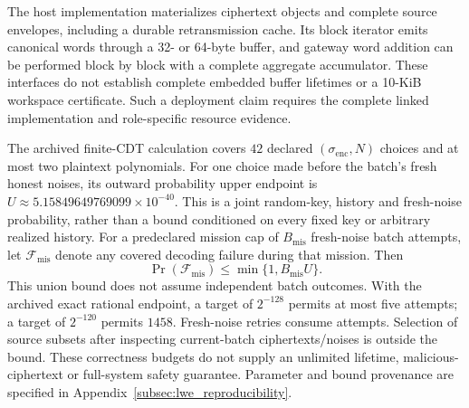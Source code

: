 The host implementation materializes ciphertext objects and complete source
envelopes, including a durable retransmission cache. Its block iterator emits
canonical words through a 32- or 64-byte buffer, and gateway word addition can
be performed block by block with a complete aggregate accumulator. These
interfaces do not establish complete embedded buffer lifetimes or a
10-KiB workspace certificate. Such a deployment claim requires the complete
linked implementation and role-specific resource evidence.

The archived finite-CDT calculation covers $42$ declared $(\sigma_{\mathrm{enc}},N)$
choices and at most two plaintext polynomials. For one choice made before the
batch's fresh honest noises, its outward probability upper endpoint is
$U\approx5.15849649769099\times10^{-40}$. This is a joint random-key,
history and fresh-noise probability, rather than a bound conditioned on every
fixed key or arbitrary realized history. For a predeclared mission cap of
$B_{\mathrm{mis}}$ fresh-noise batch attempts, let $\mathcal{F}_{\mathrm{mis}}$
denote any covered decoding failure during that mission. Then
\begin{equation}
 \Pr(\mathcal{F}_{\mathrm{mis}})\leq\min\{1,B_{\mathrm{mis}}U\}.
 \label{eq:daahe_protocol_mission_budget}
\end{equation}
This union bound does not assume independent batch outcomes. With the archived
exact rational endpoint, a target of $2^{-128}$ permits at most five attempts;
a target of $2^{-120}$ permits $1458$. Fresh-noise retries consume attempts.
Selection of source subsets after inspecting current-batch ciphertexts/noises
is outside the bound. These correctness budgets do not supply an unlimited
lifetime, malicious-ciphertext or full-system safety guarantee. Parameter and
bound provenance are specified in Appendix~\ref{subsec:lwe_reproducibility}.
